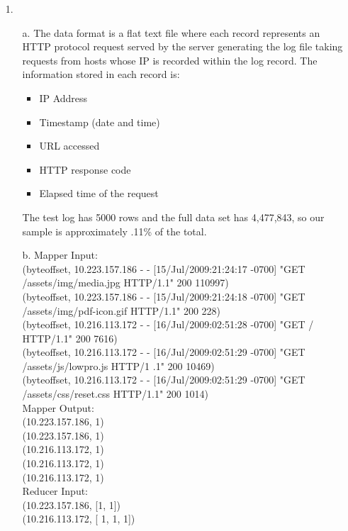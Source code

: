 \documentclass{article}
\begin{document}
\begin{itemize}
\item[1.] 
	\begin{itemize}
	\item[a.] The data format is a flat text file where each record represents an HTTP protocol request served by the server generating the log file taking requests from hosts whose IP is recorded within the log record. The information stored in each record is:\\
		\begin{itemize}
			\item IP Address
			\item Timestamp (date and time)
			\item URL accessed
			\item HTTP response code
			\item Elapsed time of the request
		\end{itemize}
	The test log has 5000 rows and the full data set has 4,477,843, so our sample is approximately .11\% of the total.	
	
	\item[b.] Mapper Input:\\
		(byteoffset, 10.223.157.186 - - [15/Jul/2009:21:24:17 -0700] "GET /assets/img/media.jpg HTTP/1.1" 200 110997)\\
		(byteoffset, 10.223.157.186 - - [15/Jul/2009:21:24:18 -0700] "GET /assets/img/pdf-icon.gif HTTP/1.1" 200 228)\\
		(byteoffset, 10.216.113.172 - - [16/Jul/2009:02:51:28 -0700] "GET / HTTP/1.1" 200 7616)\\
		(byteoffset, 10.216.113.172 - - [16/Jul/2009:02:51:29 -0700] "GET /assets/js/lowpro.js HTTP/1 .1" 200 10469)\\
		(byteoffset, 10.216.113.172 - - [16/Jul/2009:02:51:29 -0700] "GET /assets/css/reset.css HTTP/1.1" 200 1014)\\
		
	Mapper Output:\\
		(10.223.157.186, 1)\\
		(10.223.157.186, 1)\\
		(10.216.113.172, 1)\\
		(10.216.113.172, 1)\\
		(10.216.113.172, 1)\\

	Reducer Input:\\
		(10.223.157.186, [1, 1])\\
		(10.216.113.172, [ 1, 1, 1])\\
		

\end{itemize}
\end{itemize}
\end{document}
